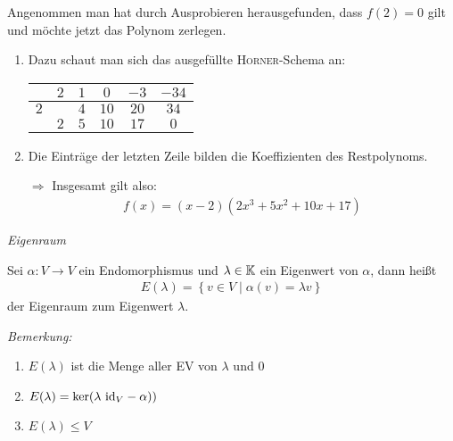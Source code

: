 \begin{itemize}
        Angenommen man hat durch Ausprobieren herausgefunden, dass $f(2)=0$ gilt und möchte jetzt das Polynom zerlegen.
        \begin{enumerate}
            \item Dazu schaut man sich das ausgefüllte \textsc{Horner}-Schema an:
                \begin{center}
                    \begin{tabular}{c|ccccc}
                        & $2$   & $1$   & $0$   & $-3$  & $-34$ \\\hline
                        $2$     &       & $4 $  & $10$  & $20$  & $34$   \\\hline
                        & $2$   & $5$   & $10$  & $17$  & $0$
                    \end{tabular}
                \end{center}
            \item Die Einträge der letzten Zeile bilden die Koeffizienten des Restpolynoms.
            \item[$\Rightarrow$] Insgesamt gilt also:
                \begin{align*}
                    f(x) = (x-2)(2x^3+5x^2+10x+17)
                \end{align*}
        \end{enumerate}
\end{itemize}


\begin{mydef}\label{eigenraum} \textit{Eigenraum}

    Sei $\alpha:V\to V$ ein Endomorphismus und $\lambda \in \mathbb{K}$ ein Eigenwert von $\alpha$, dann heißt
    \begin{align*}
        E(\lambda) = \left\{ v\in V \mid \alpha(v)=\lambda v \right\}
    \end{align*}
    der Eigenraum zum Eigenwert $\lambda$.
\end{mydef}

\textit{Bemerkung:}
\begin{enumerate}
    \item $E(\lambda)$ ist die Menge aller EV von $\lambda$ und $0$
    \item $E(\lambda) = \ker(\lambda\mbox{ id}_V-\alpha) )$
    \item $E(\lambda)\leq V$
\end{enumerate}

